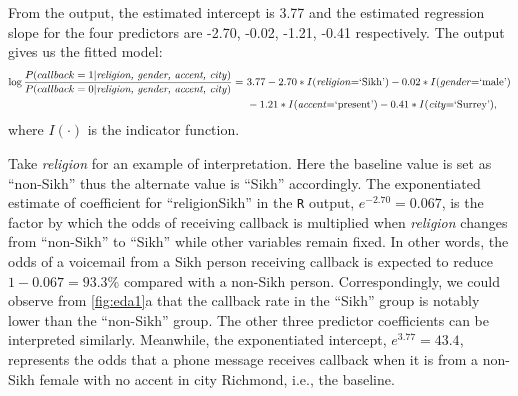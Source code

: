 \documentclass[11pt]{article}
\begin{document}
From the output, the estimated intercept is 3.77 and the estimated regression slope for the four predictors are  -2.70, -0.02, -1.21, -0.41 respectively. The output gives us the fitted model:
\begin{equation}
    \begin{split}
     \log\frac{P(callback = 1|\textnormal{\textit{religion, gender, accent, city}})}{P(callback=0|\textnormal{\textit{religion, gender, accent, city}})} =\ & 3.77 -2.70*I\textnormal{(\textit{religion}=`Sikh')}  -0.02 *I\textnormal{(\textit{gender}=`male')}  \\ & -1.21*I\textnormal{(\textit{accent}=`present')}  -0.41*I\textnormal{(\textit{city}=`Surrey')},
    \end{split}
\end{equation}
where $I(\cdot)$ is the indicator function.

Take \textit{religion} for an example of interpretation. Here the baseline value is set as ``non-Sikh'' thus the alternate value is ``Sikh'' accordingly. The exponentiated estimate of coefficient for ``religionSikh'' in the \texttt{R} output, $e^{-2.70} = 0.067$, is the factor by which the odds of receiving callback is multiplied when \textit{religion} changes from ``non-Sikh'' to ``Sikh'' while other variables remain fixed. In other words, the odds of a voicemail from a Sikh person receiving callback is expected to reduce $1-0.067 = 93.3\%$ compared with a non-Sikh person. Correspondingly, we could observe from \autoref{fig:eda1}a that the callback rate in the ``Sikh'' group is notably lower than the ``non-Sikh'' group. The other three predictor coefficients can be interpreted similarly. Meanwhile, the exponentiated intercept, $e^{3.77} = 43.4$, represents the odds that a phone message receives callback when it is from a non-Sikh female with no accent in city Richmond, i.e., the baseline. 

\end{document}
